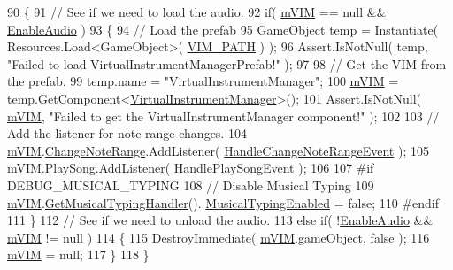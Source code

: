 \begin{DoxyCode}
90     \{
91         \textcolor{comment}{// See if we need to load the audio.}
92         \textcolor{keywordflow}{if}( \hyperlink{group___key_contain_priv_var_ga57ee3824e2f284403bb70ad9c4dfd307}{mVIM} == null && \hyperlink{group___key_contain_pub_var_ga5dc9b1349f8fafc894c7f739f6780a8c}{EnableAudio} )
93         \{
94             \textcolor{comment}{// Load the prefab}
95             GameObject temp = Instantiate( Resources.Load<GameObject>( \hyperlink{group___key_contain_const_ga8dc749271ab095b5759129459bcb647a}{VIM\_PATH} ) );
96             Assert.IsNotNull( temp, \textcolor{stringliteral}{"Failed to load VirtualInstrumentManagerPrefab!"} );
97 
98             \textcolor{comment}{// Get the VIM from the prefab.}
99             temp.name = \textcolor{stringliteral}{"VirtualInstrumentManager"};
100             \hyperlink{group___key_contain_priv_var_ga57ee3824e2f284403bb70ad9c4dfd307}{mVIM} = temp.GetComponent<\hyperlink{class_virtual_instrument_manager}{VirtualInstrumentManager}>();
101             Assert.IsNotNull( \hyperlink{group___key_contain_priv_var_ga57ee3824e2f284403bb70ad9c4dfd307}{mVIM}, \textcolor{stringliteral}{"Failed to get the VirtualInstrumentManager component!"} );
102 
103             \textcolor{comment}{// Add the listener for note range changes.}
104             \hyperlink{group___key_contain_priv_var_ga57ee3824e2f284403bb70ad9c4dfd307}{mVIM}.\hyperlink{group___v_i_m_events_gab6fa99d08e8466406835b9fc4ff859f1}{ChangeNoteRange}.AddListener( 
      \hyperlink{group___key_contain_handlers_ga0d82098e4f886f77a33f9d5ed13fe195}{HandleChangeNoteRangeEvent} );
105             \hyperlink{group___key_contain_priv_var_ga57ee3824e2f284403bb70ad9c4dfd307}{mVIM}.\hyperlink{group___v_i_m_events_gae450bdba9c513ab4e43f69def50fa84d}{PlaySong}.AddListener( \hyperlink{group___key_contain_handlers_ga894c823059c5268af0954f83c04036ed}{HandlePlaySongEvent} );
106 
107 \textcolor{preprocessor}{            #if DEBUG\_MUSICAL\_TYPING}
108                 \textcolor{comment}{// Disable Musical Typing}
109                 \hyperlink{group___key_contain_priv_var_ga57ee3824e2f284403bb70ad9c4dfd307}{mVIM}.\hyperlink{group___v_i_m_pub_func_gae6701458a23a3f14db90501f871d4d0d}{GetMusicalTypingHandler}().
      \hyperlink{group___mus_typ_pub_var_ga09a764161d537b31fac1a64ee5d39625}{MusicalTypingEnabled} = \textcolor{keyword}{false};
110 \textcolor{preprocessor}{            #endif}
111         \}
112         \textcolor{comment}{// See if we need to unload the audio.}
113         \textcolor{keywordflow}{else} \textcolor{keywordflow}{if}( !\hyperlink{group___key_contain_pub_var_ga5dc9b1349f8fafc894c7f739f6780a8c}{EnableAudio} && \hyperlink{group___key_contain_priv_var_ga57ee3824e2f284403bb70ad9c4dfd307}{mVIM} != null )
114         \{
115             DestroyImmediate( \hyperlink{group___key_contain_priv_var_ga57ee3824e2f284403bb70ad9c4dfd307}{mVIM}.gameObject, \textcolor{keyword}{false} );
116             \hyperlink{group___key_contain_priv_var_ga57ee3824e2f284403bb70ad9c4dfd307}{mVIM} = null;
117         \}
118     \}
\end{DoxyCode}
